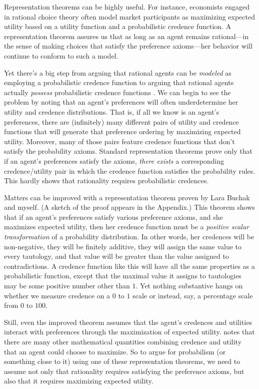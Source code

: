 Representation theorems can be highly useful. For instance, economists engaged in rational choice theory often model market participants as maximizing expected utility based on a utility function and a probabilistic credence function. A representation theorem assures us that as long as an agent remains rational---in the sense of making choices that satisfy the preference axioms---her behavior will continue to conform to such a model.

Yet there's a big step from arguing that rational agents can be \emph{modeled} as employing a probabilistic credence function to arguing that rational agents actually \emph{possess} probabilistic credence functions \citep{HajekArguments,MeachamWeisberg}. We can begin to see the problem by noting that an agent's preferences will often underdetermine her utility and credence distributions. That is, if all we know is an agent's preferences, there are (infinitely) many different pairs of utility and credence functions that will generate that preference ordering by maximizing expected utility. Moreover, many of those pairs feature credence functions that don't satisfy the probability axioms. Standard representation theorems prove only that if an agent's preferences satisfy the axioms, \emph{there exists} a corresponding credence/utility pair in which the credence function satisfies the probability rules. This hardly shows that rationality requires probabilistic credences.

Matters can be improved with a representation theorem proven by Lara Buchak and myself. (A sketch of the proof appears in the Appendix.) This theorem shows that if an agent's preferences satisfy various preference axioms, and she maximizes expected utility, then her credence function must be a \emph{positive scalar transformation} of a probability distribution. In other words, her credences will be non-negative, they will be finitely additive, they will assign the same value to every tautology, and that value will be greater than the value assigned to contradictions. A credence function like this will have all the same properties as a probabilistic function, except that the maximal value it assigns to tautologies may be some positive number other than $1$. Yet nothing substantive hangs on whether we measure credence on a $0$ to $1$ scale or instead, say, a percentage scale from $0$ to $100$.

Still, even the improved theorem assumes that the agent's credences and utilities interact with preferences through the maximization of expected utility. \citet{ZyndaRepresentation} notes that there are many other mathematical quantities combining credence and utility that an agent could choose to maximize. So to argue for probabilism (or something close to it) using one of these representation theorems, we need to assume not only that rationality requires satisfying the preference axioms, but also that it requires maximizing expected utility.


